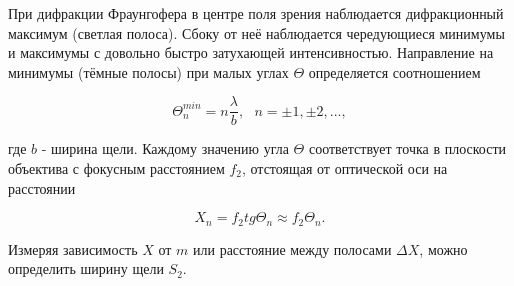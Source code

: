 \documentclass[a4paper,12pt]{article} %
\begin{document}
При дифракции Фраунгофера в центре поля зрения наблюдается дифракционный максимум (светлая полоса). Сбоку от неё наблюдается чередующиеся минимумы и максимумы с довольно быстро затухающей интенсивностью. Направление на минимумы (тёмные полосы) при малых углах $\Theta$ определяется соотношением

\[ \Theta_{n}^{min} = n\frac{\lambda}{b}, \text{ } n=\pm1, \pm2,..., \]

где $b$ - ширина щели. Каждому значению угла $\Theta$ соответствует точка в плоскости объектива с фокусным расстоянием $f_2$, отстоящая от оптической оси на расстоянии

\[ X_{n}=f_2 tg{\Theta_{n}} \approx f_2\Theta_{n}. \]

Измеряя зависимость $X$ от $m$ или расстояние между полосами $\Delta X$, можно определить ширину щели $S_2$.
\end{document}
